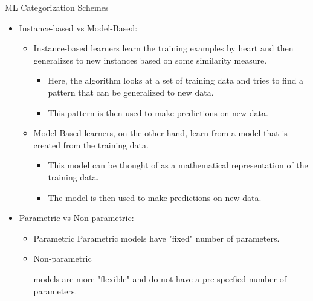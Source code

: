 \documentclass[compress,oilve]{beamer}
\newcommand{\tc}[2]{
	\textcolor{#1}{#2}
}
\begin{document}
\begin{frame}{ML Categorization Schemes}
	\begin{itemize}
		\item Instance-based vs Model-Based:
		\begin{itemize}
			\item \tc{keywords}{Instance-based}learners learn the training examples by heart and then generalizes to new instances based on some similarity measure.
			
			\begin{itemize}
				\item Here, the algorithm looks at a set of training data and tries to find a pattern that can be generalized to new data.
				
				\item This pattern is then used to make predictions on new data.
			\end{itemize}
			
			\item \tc{keywords}{Model-Based} learners, on the other hand, learn from a model that is created from the training data.
			
			\begin{itemize}
				\item This model can be thought of as a mathematical representation of the training data.
				\item The model is then used to make predictions on new data.
			\end{itemize}
		\end{itemize}
		
		\medskip
		\item Parametric vs Non-parametric:
		
		\begin{itemize}
			\item \tc{keywords}{Parametric} Parametric models have "fixed" number of parameters.
			
			\item \tc{keywords}{Non-parametric}
			models are more "flexible" and do not have a pre-specfied number of parameters.
			
		\end{itemize}
		
		\medskip
	\end{itemize}
\end{frame}


\end{document}
